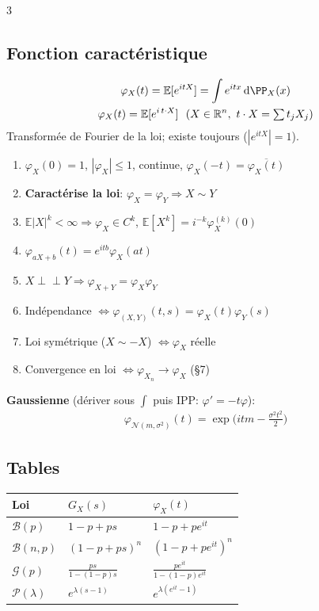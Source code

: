 \documentclass[12pt, a4paper]{article}
\newcommand{\dd}{\mathrm{d}}
\newcommand{\E}{\mathbb{E}}
\newcommand{\R}{\mathbb{R}}
\begin{document}
\begin{multicols*}{3}
	\subsection{Fonction caractéristique}
	\begin{gather*}
		\varphi_X(t)=\E[e^{itX}]=\int e^{itx}\,\dd\PP_X(x)\\
		\varphi_X(t)=\E[e^{i\,t\cdot X}]\ \ (X\in\R^n,\ t\cdot X=\textstyle\sum t_jX_j)
	\end{gather*}
	Transformée de Fourier de la loi; existe toujours ($|e^{itX}|=1$).
	\begin{enumerate}[\roman*.]
		\item $\varphi_X(0)=1$, $|\varphi_X|\leq1$, continue, $\varphi_X(-t)=\overline{\varphi_X(t)}$
		\item \textbf{Caractérise la loi}: $\varphi_X=\varphi_Y\Rightarrow X\sim Y$
		\item $\E|X|^k<\infty\Rightarrow\varphi_X\in C^k$, $\E[X^k]=i^{-k}\varphi_X^{(k)}(0)$
		\item $\varphi_{aX+b}(t)=e^{itb}\varphi_X(at)$
		\item $X\perp\!\!\!\perp Y\Rightarrow\varphi_{X+Y}=\varphi_X\varphi_Y$
		\item Indépendance $\iff\varphi_{(X,Y)}(t,s)=\varphi_X(t)\varphi_Y(s)$
		\item Loi symétrique ($X\sim-X$) $\iff\varphi_X$ réelle
		\item Convergence en loi $\iff\varphi_{X_n}\to\varphi_X$ (§7)
	\end{enumerate}
	\textbf{Gaussienne} (dériver sous $\int$ puis IPP: $\varphi'=-t\varphi$):
	\begin{gather*}
		\varphi_{\mathcal N(m,\sigma^2)}(t)=\exp\Big(itm-\frac{\sigma^2t^2}2\Big)
	\end{gather*}

	\colbreak
	\subsection{Tables}
	\begin{tabular}{|l|l|l|}
		\hline
		\textbf{Loi}          & $G_X(s)$                       & $\varphi_X(t)$                             \\
		\hline
		$\mathcal B(p)$       & $1-p+ps$                       & $1-p+pe^{it}$                              \\
		$\mathcal B(n,p)$     & $(1-p+ps)^n$                   & $(1-p+pe^{it})^n$                          \\
		$\mathcal G(p)$       & $\frac{ps}{1-(1-p)s}$          & $\frac{pe^{it}}{1-(1-p)e^{it}}$            \\
		$\mathcal P(\lambda)$ & $e^{\lambda(s-1)}$             & $e^{\lambda(e^{it}-1)}$                    \\
		\hline
	\end{tabular}


\end{multicols*}
\end{document}
